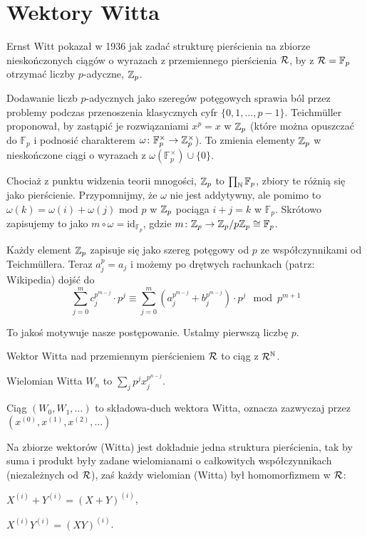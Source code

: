 \section{Wektory Witta}
Ernst Witt pokazał w 1936 jak zadać strukturę pierścienia na zbiorze nieskończonych ciągów o wyrazach z przemiennego pierścienia $\mathcal R$, by z $\mathcal R = \mathbb F_p$ otrzymać liczby $p$-adyczne, $\mathbb Z_p$.

Dodawanie liczb $p$-adycznych jako szeregów potęgowych sprawia ból przez problemy podczas przenoszenia klasycznych cyfr $\{0, 1, \ldots, p-1\}$.
Teichmüller proponował, by zastąpić je rozwiązaniami $x^p = x$ w $\mathbb Z_p$ (które można opuszczać do $\mathbb F_p$ i podnosić charakterem $\omega \colon \mathbb F_p^\times \to \mathbb Z_p^\times$).
To zmienia elementy $\mathbb Z_p$ w nieskończone ciągi o wyrazach z $\omega(\mathbb{F}_p^\times) \cup \{0\}$.

Chociaż z punktu widzenia teorii mnogości, $\mathbb Z_p$ to $\prod_\mathbb N \mathbb F_p$, zbiory te różnią się jako pierścienie.
Przypomnijmy, że $\omega$ nie jest addytywny, ale pomimo to $\omega(k) = \omega(i) + \omega(j)$ mod $p$ w $\mathbb Z_p$ pociąga $i + j = k$ w $\mathbb F_p$.
Skrótowo zapisujemy to jako $m \circ \omega = \mathrm{id}_{\mathbb F_p}$, gdzie $m \colon \mathbb Z_p \to \mathbb Z_p / p \mathbb Z_p \cong \mathbb F_p$.

Każdy element $\mathbb Z_p$ zapisuje się jako szereg potęgowy od $p$ ze współczynnikami od Teichmüllera.
Teraz $a_j^p = a_j$ i możemy po drętwych rachunkach (patrz: Wikipedia) dojść do
\[
		\sum_{j=0}^m c_j^{p^{m-j}} \cdot p^j \equiv \sum_{j=0}^m (a_j^{p^{m-j}} + b_j^{p^{m-j}}) \cdot p^j \mod p^{m+1}
\]

To jakoś motywuje nasze postępowanie.
Ustalmy pierwszą liczbę $p$.

\begin{definicja}
	Wektor Witta nad przemiennym pierścieniem $\mathcal R$ to ciąg z $\mathcal R^{\mathbb N}$.
\end{definicja}

\begin{definicja}
	Wielomian Witta $W_n$ to $\sum_j p^j x_j^{p^{n-j}}$.
\end{definicja}

\begin{definicja}
	Ciąg $(W_0, W_1, \ldots)$ to składowa-duch wektora Witta, oznacza zazwyczaj przez $(x^{(0)},x^{(1)},x^{(2)}, \ldots)$
\end{definicja}

Na zbiorze wektorów (Witta) jest dokładnie jedna struktura pierścienia, tak by suma i produkt były zadane wielomianami o całkowitych współczynnikach (niezależnych od $\mathcal R$), zaś każdy wielomian (Witta) był homomorfizmem w $\mathcal R$:
\begin{enumx}
\item $X^{(i)}+Y^{(i)}=(X+Y)^{(i)}$,
\item $X^{(i)}Y^{(i)}=(XY)^{(i)}$.
\end{enumx}

